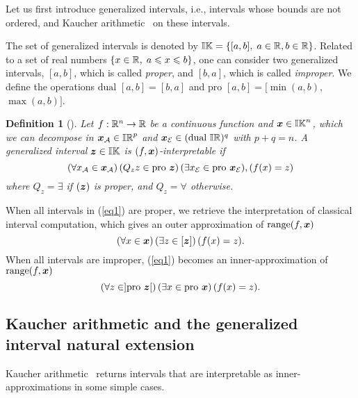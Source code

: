 \documentclass{sig-alternate-05-2015} %
\newtheorem{definition}{Definition}
\DeclareMathOperator{\range}{range}
\newcommand{\pro}{\mbox{pro }}
\def\bbr{{\Bbb R}}
\def\I{{\Bbb I \Bbb R}}
\def\K{{\Bbb I \Bbb K}}
\begin{document}
Let us first introduce generalized intervals, i.e., intervals whose
bounds are not ordered, and Kaucher arithmetic~\cite{Kaucher} on these intervals.  

The set of generalized
intervals is denoted by $\K = \{ [a,b], \; a\in \bbr, b \in \bbr\}$.
Related to a set of real numbers $\{x \in \bbr, \; a \leqslant x \leqslant b\}$, one can consider two generalized 
intervals, $[a,b]$, which is called \emph{proper}, and $[b,a]$, which is called 
\emph{improper}. We define the operations $\mbox{dual } [a,b]=[b,a]$ and 
$\pro [a,b]=[\min(a,b),$ $\max(a,b)]$. 

\begin{definition} [\cite{gold1}]
\label{pb1}
Let $f : \bbr^n \rightarrow \bbr$ be a continuous function and $\x \in \K^n$, which we can decompose in $\x_{\cal A} \in \I^p$ 
and $\x_{\cal E} \in (\mbox{dual }\I)^q$ with $p+q=n$. A generalized interval 
$\z \in \K$ is $(f,\x)$-interpretable if
\begin{equation}
 (\forall x_{\cal A} \in \x_{\cal A})\, (Q_z z \in \pro \z)\, (\exists x_{\cal E} \in \pro \x_{\cal E}),
(f(x)=z)
\label{eq1}
\end{equation}
where $Q_z = \exists$ if $(\z)$ is proper, and  $Q_z = \forall$ otherwise. 
\end{definition}

When all intervals in (\ref{eq1}) are proper, we retrieve the interpretation of classical interval 
computation, which gives an outer approximation of $\range(f,\x)$
\[ (\forall x \in \x) \, (\exists z \in [\z]) \, (f(x)=z).    \]
When all intervals are improper, (\ref{eq1}) becomes an inner-approx\-imation  of $\range(f,\x)$
\[ (\forall z \in ]\pro \z[) \, (\exists x \in \pro \x) \, (f(x)=z).    \] 

\subsection{Kaucher arithmetic and the generalized interval natural extension}
\label{Kaucherar2}
 Kaucher arithmetic~\cite{Kaucher} returns intervals that are interpretable as inner-approximations in some simple cases. 
\end{document}

